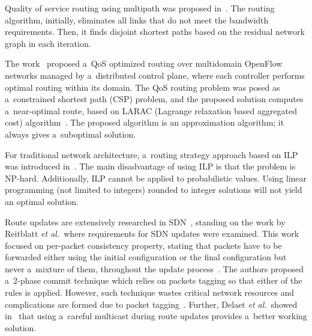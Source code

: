 \begin{multicols}{2}
\vspace*{-2pt}


\noindent
Quality of service routing using multipath was proposed in~\cite{devi_approach_2015}. 
The routing algorithm, initially, eliminates all links that do not meet the 
bandwidth requirements. Then, it finds disjoint shortest paths based on 
the residual network graph in each iteration.

The work~\cite{egilmez_distributed_2012} proposed a~QoS optimized routing 
over multidomain OpenFlow networks managed by a~distributed control plane, 
where each controller performs optimal routing within its domain. 
The QoS routing problem was posed as a~constrained shortest path (CSP) problem, 
and the proposed solution computes a~near-optimal route, based on LARAC 
(Lagrange relaxation based aggregated cost)
algorithm~\cite{juttner_lagrange_2001}. The proposed algorithm is an approximation 
algorithm; it always gives a~suboptimal solution.

For traditional network architecture, a~routing strategy approach based on 
ILP was introduced in~\cite{yu_efficient_2013}.
 The main disadvantage of using ILP is that the problem is NP-hard. 
 Additionally, ILP cannot be applied to probabilistic values. 
 Using linear programming (not limited to integers) rounded to integer solutions 
 will not yield an optimal solution.
 

Route updates are extensively researched in SDN~\cite{foerster_survey_2016}, 
standing on the work by Reitblatt \textit{et al.}\ where requirements for SDN 
updates were examined. This work focused on per-packet consistency property, 
stating that packets have to be forwarded either using the initial configuration 
or the final configuration but never a~mixture of them, throughout the update 
process~\cite{reitblatt_consistent_2011}. The authors proposed 
a~2-phase commit technique which relies on packets tagging so that either of 
the rules is applied. However, such technique wastes critical network resources 
and complications are formed due to packet tagging~\cite{foerster_survey_2016}. 
Further, Delaet \textit{et al.}\ showed in~\cite{delaet_seamless_2015} 
that using a~careful multicast during route updates provides 
a~better working solution.


\end{multicols}
